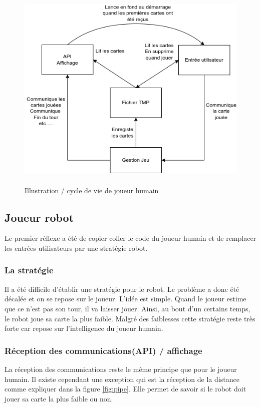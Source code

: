 \documentclass{article}
\begin{document}
\begin{figure}[!htb]
	\centering
    	\includegraphics[height=10cm]{./assets/JoueurHumain.png}
    	\caption{Illustration / cycle de vie de joueur humain}
\end{figure}

\newpage

\subsection{Joueur robot}
Le premier réflexe a été de copier coller le code du joueur humain et de remplacer les entrées utilisateurs par une stratégie robot. 

\subsubsection{La stratégie}
Il a été difficile d'établir une stratégie pour le robot. Le problème a donc été décalée et on se repose sur le joueur. L'idée est simple. Quand le joueur estime que ce n'est pas son tour, il va laisser jouer. Ainsi, au bout d'un certains temps, le robot joue sa carte la plus faible. Malgré des faiblesses cette stratégie reste très forte car repose sur l'intelligence du joueur humain. 

\subsubsection{Réception des communications(API) / affichage}
La réception des communications reste le même principe que pour le joueur humain. Il existe cependant une exception qui est la réception de la distance comme expliquer dans la figure \ref{fig:pipe}. Elle permet de savoir si le robot doit jouer sa carte la plus faible ou non. 
\end{document}
